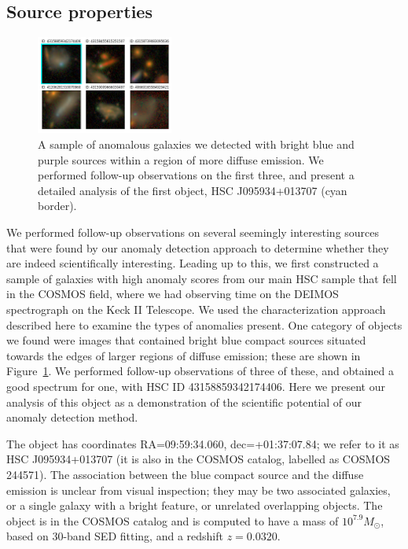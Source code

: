 \subsection{Source properties}

\begin{figure}
    \centering
    \includegraphics[width=0.4\textwidth]{bluecores}
    \caption{A sample of anomalous galaxies we detected with bright blue and purple sources within a region of more diffuse emission. We performed follow-up observations on the first three, and present a detailed analysis of the first object, HSC J095934+013707 (cyan border).}
    \label{fig:bluecores}
\end{figure}

We performed follow-up observations on several seemingly interesting sources that were found by our anomaly detection approach to determine whether they are indeed scientifically interesting.
Leading up to this, we first constructed a sample of galaxies with high anomaly scores from our main HSC sample that fell in the COSMOS field, where we had observing time on the DEIMOS spectrograph on the Keck II Telescope.
We used the characterization approach described here to examine the types of anomalies present.
One category of objects we found were images that contained bright blue compact sources situated towards the edges of larger regions of diffuse emission; these are shown in Figure~\ref{fig:bluecores}.
We performed follow-up observations of three of these, and obtained a good spectrum for one, with HSC ID 43158859342174406.
Here we present our analysis of this object as a demonstration of the scientific potential of our anomaly detection method.

The object has coordinates RA=09:59:34.060, dec=+01:37:07.84; we refer to it as HSC J095934+013707 (it is also in the COSMOS catalog, labelled as COSMOS 244571).
The association between the blue compact source and the diffuse emission is unclear from visual inspection; they may be two associated galaxies, or a single galaxy with a bright feature, or unrelated overlapping objects.
The object is in the COSMOS catalog and is computed to have a mass of $10^{7.9} M_\odot$, based on 30-band SED fitting, and a redshift $z=0.0320$. 

